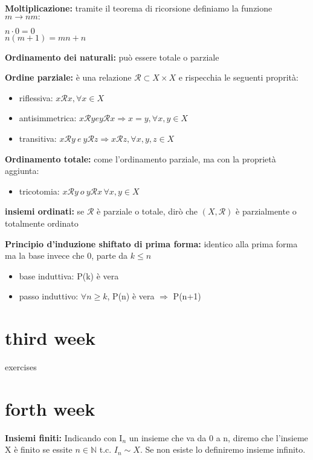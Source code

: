 \documentclass[11pt, letterpaper]{article}
\begin{document}
\textbf{Moltiplicazione:} tramite il teorema di ricorsione definiamo la funzione $m\rightarrow nm:$
\begin{center}
    $n\cdot 0 = 0$\\
    $n(m+1)=mn+n$
\end{center}

\textbf{Ordinamento dei naturali:} può essere totale o parziale

\textbf{Ordine parziale:} è una relazione $\mathcal{R}\subset X\times X$ e rispecchia le seguenti proprità:
\begin{itemize}
    \item riflessiva: $x\mathcal{R}x, \forall x\in X$
    \item antisimmetrica: $x\mathcal{R}y e y\mathcal{R} x\Rightarrow x=y, \forall x,y \in X$
    \item transitiva: $x\mathcal{R}y\ e\ y\mathcal{R} z\Rightarrow x\mathcal{R}z, \forall x,y,z \in X$
\end{itemize}

\textbf{Ordinamento totale:} come l'ordinamento parziale, ma con la proprietà aggiunta:
\begin{itemize}
    \item tricotomia: $x\mathcal{R}y\ o\ y\mathcal{R} x\, \forall x,y \in X$
\end{itemize}

\textbf{insiemi ordinati:} se $\mathcal{R}$ è parziale o totale, dirò che $(X,\mathcal{R})$ è 
parzialmente o totalmente ordinato

\textbf{Principio d'induzione shiftato di prima forma:} identico alla prima forma ma la base
invece che 0, parte da $k\leq n$
\begin{itemize}
    \item base induttiva: P(k) è vera
    \item passo induttivo: $\forall n\geq k$, P(n) è vera $\Rightarrow$ P(n+1)
\end{itemize}

\section{third week}
exercises

\newpage
\section{forth week}

\textbf{Insiemi finiti:} Indicando con I$_{n}$ un insieme che va da 0 a n, diremo che l'insieme X è finito
se essite $n\in\mathbb{N}$ t.c. $I_{n}\sim X$. Se non esiste lo definiremo insieme infinito.
\end{document}
